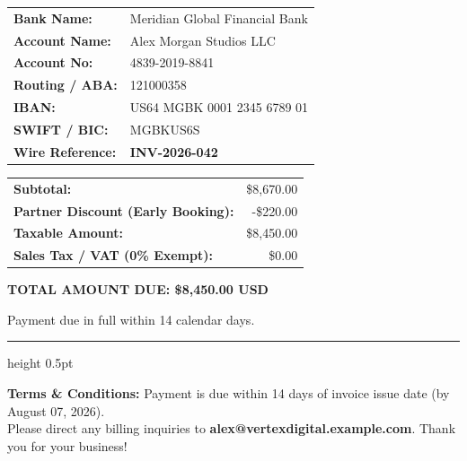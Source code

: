 \documentclass[10pt,a4paper]{article}
\begin{document}
\begin{minipage}[t]{0.485\textwidth}
    \begin{tcolorbox}[title=\color{AccentColor}\faLock\ \ PAYMENT METHOD \& BANK DETAILS, colbacktitle=AccentLight, colframe=BorderGray, coltitle=AccentColor]
        \color{SecondaryGray}\small
        \begin{tabular}{@{}l l@{}}
            \textbf{Bank Name:} & Meridian Global Financial Bank \\
            \textbf{Account Name:} & Alex Morgan Studios LLC \\
            \textbf{Account No:} & 4839-2019-8841 \\
            \textbf{Routing / ABA:} & 121000358 \\
            \textbf{IBAN:} & US64 MGBK 0001 2345 6789 01 \\
            \textbf{SWIFT / BIC:} & MGBKUS6S \\
            \textbf{Wire Reference:} & \textbf{\color{AccentBright} INV-2026-042}
        \end{tabular}
    \end{tcolorbox}
\end{minipage}%
\hfill
\begin{minipage}[t]{0.485\textwidth}
    \vspace*{1pt}
    \begin{tabularx}{\linewidth}{@{} X r @{}}
        \color{SecondaryGray}\textbf{Subtotal:} & \$8,670.00 \\
        \color{SecondaryGray}\textbf{Partner Discount (Early Booking):} & -\$220.00 \\
        \color{SecondaryGray}\textbf{Taxable Amount:} & \$8,450.00 \\
        \color{SecondaryGray}\textbf{Sales Tax / VAT (0\% Exempt):} & \$0.00 \\
    \end{tabularx}
    \vspace{2pt}
    \begin{tcolorbox}[colback=AccentColor, colframe=AccentColor, arc=3.5pt, top=4pt, bottom=4pt, left=7pt, right=7pt]
        \color{white}
        \large \bfseries
        TOTAL AMOUNT DUE: \hfill \$8,450.00 USD
    \end{tcolorbox}
    \vspace{1pt}
    {\raggedleft \footnotesize \color{SecondaryGray} Payment due in full within 14 calendar days.\par}
\end{minipage}

\vfill

{\color{BorderGray}\hrule height 0.5pt}
\vspace{3pt}

\begin{center}
    \color{SecondaryGray}\footnotesize
    \textbf{Terms \& Conditions:} Payment is due within 14 days of invoice issue date (by August 07, 2026).\\
    Please direct any billing inquiries to \textbf{alex@vertexdigital.example.com}. Thank you for your business!
\end{center}
\end{document}
